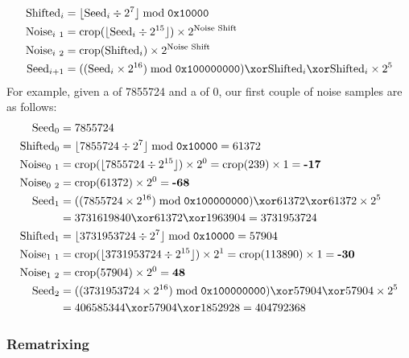 \begin{align*}
\text{Shifted}_i &= \lfloor\text{Seed}_i \div 2 ^ 7\rfloor \bmod{\texttt{0x10000}} \\
\text{Noise}_{i~1} &= \text{crop}(\lfloor\text{Seed}_i \div 2 ^ {15}\rfloor) \times 2 ^ {\text{Noise Shift}} \\
\text{Noise}_{i~2} &= \text{crop}(\text{Shifted}_i) \times 2 ^ {\text{Noise Shift}} \\
\text{Seed}_{i + 1} &= ((\text{Seed}_i \times 2 ^ {16}) \bmod{\texttt{0x100000000}}) \xor \text{Shifted}_i \xor \text{Shifted}_i \times 2 ^ 5
\end{align*}
For example, given a  of 7855724 and a
 of 0, our first couple of noise samples are
as follows:
\begin{align*}
\text{Seed}_0 &= 7855724 \\
\text{Shifted}_0 &= \lfloor 7855724 \div 2 ^ 7\rfloor \bmod{\texttt{0x10000}} = 61372 \\
\text{Noise}_{0~1} &= \text{crop}(\lfloor 7855724 \div 2 ^ {15}\rfloor) \times 2 ^ 0 = \text{crop}(239) \times 1 = \textbf{-17} \\
\text{Noise}_{0~2} &= \text{crop}(61372) \times 2 ^ 0 = \textbf{-68} \\
\text{Seed}_1 &= ((7855724 \times 2 ^ {16}) \bmod{\texttt{0x100000000}}) \xor 61372 \xor 61372 \times 2 ^ 5 \\
&= 3731619840 \xor 61372 \xor 1963904 = 3731953724 \\
\text{Shifted}_1 &= \lfloor 3731953724 \div 2 ^ 7 \rfloor \bmod{\texttt{0x10000}} = 57904 \\
\text{Noise}_{1~1} &= \text{crop}(\lfloor 3731953724 \div 2 ^ {15}\rfloor) \times 2 ^ 1 = \text{crop}(113890) \times 1 = \textbf{-30} \\
\text{Noise}_{1~2} &= \text{crop}(57904) \times 2 ^ 0 = \textbf{48} \\
\text{Seed}_2 &= ((3731953724 \times 2 ^ {16}) \bmod{\texttt{0x100000000}}) \xor 57904 \xor 57904 \times 2 ^ 5 \\
&= 406585344 \xor 57904 \xor 1852928 = 404792368
\end{align*}

\clearpage

\subsubsection{Rematrixing}

